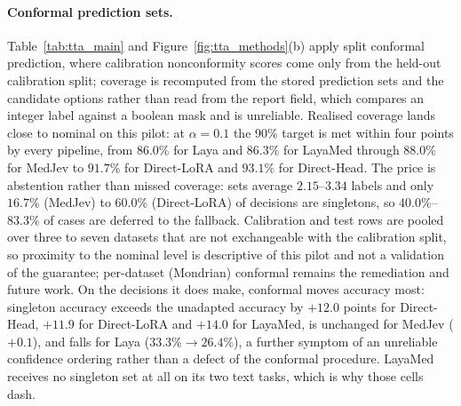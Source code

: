 \paragraph{Conformal prediction sets.}
Table~\ref{tab:tta_main} and Figure~\ref{fig:tta_methods}(b) apply split conformal prediction, where calibration nonconformity scores come only from the held-out calibration split; coverage is recomputed from the stored prediction sets and the candidate options rather than read from the report field, which compares an integer label against a boolean mask and is unreliable. Realised coverage lands close to nominal on this pilot: at $\alpha=0.1$ the 90\% target is met within four points by every pipeline, from $86.0\%$ for Laya and $86.3\%$ for LayaMed through $88.0\%$ for MedJev to $91.7\%$ for Direct-LoRA and $93.1\%$ for Direct-Head. The price is abstention rather than missed coverage: sets average $2.15$--$3.34$ labels and only $16.7\%$ (MedJev) to $60.0\%$ (Direct-LoRA) of decisions are singletons, so $40.0\%$--$83.3\%$ of cases are deferred to the fallback. Calibration and test rows are pooled over three to seven datasets that are not exchangeable with the calibration split, so proximity to the nominal level is descriptive of this pilot and not a validation of the guarantee; per-dataset (Mondrian) conformal remains the remediation and future work. On the decisions it does make, conformal moves accuracy most: singleton accuracy exceeds the unadapted accuracy by $+12.0$ points for Direct-Head, $+11.9$ for Direct-LoRA and $+14.0$ for LayaMed, is unchanged for MedJev ($+0.1$), and falls for Laya ($33.3\%\rightarrow26.4\%$), a further symptom of an unreliable confidence ordering rather than a defect of the conformal procedure. LayaMed receives no singleton set at all on its two text tasks, which is why those cells dash.

